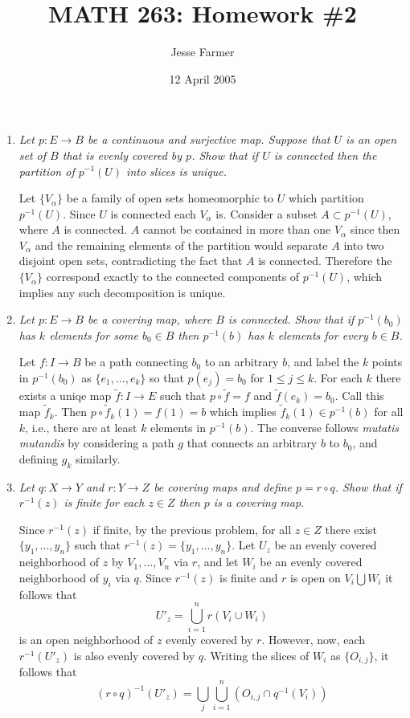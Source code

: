 \documentclass[10pt]{article}
\title{MATH 263: Homework \#2}
\author{Jesse Farmer}
\date{12 April 2005}
\begin{document}
\maketitle
\begin{enumerate}

\item \emph{Let $p: E \rightarrow B$ be a continuous and surjective map.  Suppose that $U$ is an open set of $B$ that is evenly covered by $p$.  Show that if $U$ is connected then the partition of $p^{-1}(U)$ into slices is unique.}

Let $\{V_\alpha\}$ be a family of open sets homeomorphic to $U$ which partition $p^{-1}(U)$.  Since $U$ is connected each $V_\alpha$ is.  Consider a subset $A \subset p^{-1}(U)$, where $A$ is connected.  $A$ cannot be contained in more than one $V_\alpha$ since then $V_\alpha$ and the remaining elements of the partition would separate $A$ into two disjoint open sets, contradicting the fact that $A$ is connected.  Therefore the $\{V_\alpha\}$ correspond exactly to the connected components of $p^{-1}(U)$, which implies any such decomposition is unique.

\item \emph{Let $p: E \rightarrow B$ be a covering map, where $B$ is connected.  Show that if $p^{-1}(b_0)$ has $k$ elements for some $b_0 \in B$ then $p^{-1}(b)$ has $k$ elements for every $b \in B$.}

Let $f: I \rightarrow B$ be a path connecting $b_0$ to an arbitrary $b$, and label the $k$ points in $p^{-1}(b_0)$ as $\{e_1, \ldots, e_k\}$ so that $p(e_j) = b_0$ for $1 \leq j \leq k$.  For each $k$ there exists a uniqe map $\tilde{f}: I \rightarrow E$ such that $p \circ \tilde{f} = f$ and $\tilde{f}(e_k) = b_0$.  Call this map $\tilde{f}_k$.  Then $p \circ \tilde{f}_k(1) = f(1) = b$ which implies $\tilde{f}_k(1) \in p^{-1}(b)$ for all $k$, i.e., there are at least $k$ elements in $p^{-1}(b)$.  The converse follows \emph{mutatis mutandis} by considering a path $g$ that connects an arbitrary $b$ to $b_0$, and defining $g_k$ similarly.

\item \emph{Let $q: X \rightarrow Y$ and $r : Y \rightarrow Z$ be covering maps and define $p = r \circ q$.  Show that if $r^{-1}(z)$ is finite for each $z \in Z$ then $p$ is a covering map.}

Since $r^{-1}(z)$ if finite, by the previous problem, for all $z \in Z$ there exist $\{y_1, \ldots, y_n\}$ such that $r^{-1}(z) = \{y_1, \ldots, y_n\}$.  Let $U_z$ be an evenly covered neighborhood of $z$ by $V_1, \ldots, V_n$ via $r$, and let $W_i$ be an evenly covered neighborhood of $y_i$ via $q$.  Since $r^{-1}(z)$ is finite and $r$ is open on $V_i \bigcup W_i$ it follows that $$U'_z = \bigcup_{i=1}^n r\left(V_i \cup W_i\right)$$ is an open neighborhood of $z$ evenly covered by $r$.  However, now, each $r^{-1}(U'_z)$ is also evenly covered by $q$.  Writing the slices of $W_i$ as $\{O_{i,j}\}$, it follows that
\[
(r \circ q)^{-1} \left( U'_z \right) = \bigcup_j \bigcup_{i=1}^n \left( O_{i,j} \cap q^{-1}(V_i)\right)
\]


\end{enumerate}
\end{document}
